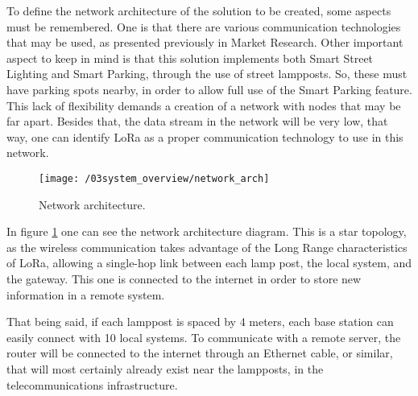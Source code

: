 To define the network architecture of the solution to be created, some aspects must be remembered. One is that there are various communication technologies that may be used, as presented previously in Market Research. Other important aspect to keep in mind is that this solution implements both Smart Street Lighting and Smart Parking, through the use of street lampposts. So, these must have parking spots nearby, in order to allow full use of the Smart Parking feature. This lack of flexibility demands a creation of a network with nodes that may be far apart. Besides that, the data stream in the network will be very low, that way, one can identify LoRa as a proper communication technology to use in this network.

\begin{figure}[ht]
	\centering
	\texttt{[image: /03system\_overview/network\_arch]}
	\caption{Network architecture.}
	\label{fig:network_arch}
\end{figure}

In figure \ref{fig:network_arch} one can see the network architecture diagram. This is a star topology, as the wireless communication takes advantage of the Long Range characteristics of LoRa, allowing a single-hop link between each lamp post, the local system, and the gateway. This one is connected to the internet in order to store new information in a remote system.



That being said, if each lamppost is spaced by 4 meters, each base station can easily connect with 10 local systems. To communicate with a remote server, the router will be connected to the internet through an Ethernet cable, or similar, that will most certainly already exist near the lampposts, in the telecommunications infrastructure.

